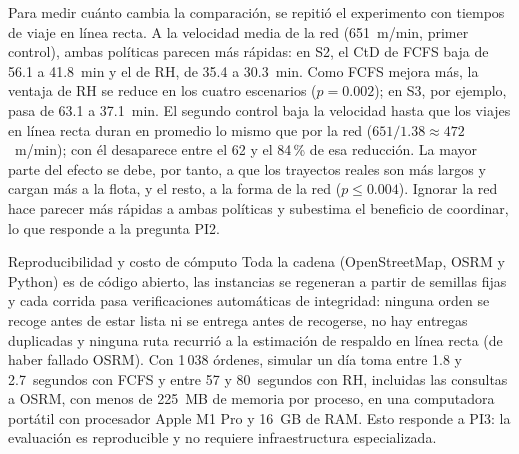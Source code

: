\documentclass[10pt]{article}
\makeatletter
\renewcommand{\subsection}{\@startsection{subsection}{2}{0pt}{8pt}{0.1pt}
  {\semibold\itshape\fontsize{11}{13.4}\selectfont\addfontfeatures{LetterSpace=6.8}\raggedright}}
\makeatother
\begin{document}
Para medir cuánto cambia la comparación, se repitió el experimento con tiempos de viaje en línea
recta. A la velocidad media de la red (651~m/min, primer control), ambas políticas parecen más
rápidas: en S2, el CtD de FCFS baja de 56.1 a 41.8~min y el de RH, de 35.4 a 30.3~min. Como FCFS
mejora más, la ventaja de RH se reduce en los cuatro escenarios ($p = 0.002$); en S3, por ejemplo,
pasa de 63.1 a 37.1~min. El segundo control baja la velocidad hasta que los viajes en línea recta
duran en promedio lo mismo que por la red ($651/1.38 \approx 472$~m/min); con él desaparece entre el
62 y el 84\,\% de esa reducción. La mayor parte del efecto se debe, por tanto, a que los trayectos
reales son más largos y cargan más a la flota, y el resto, a la forma de la red ($p \leq 0.004$).
Ignorar la red hace parecer más rápidas a ambas políticas y subestima el beneficio de coordinar, lo
que responde a la pregunta PI2.

\subsection{Reproducibilidad y costo de cómputo}
Toda la cadena (OpenStreetMap, OSRM y Python) es de código abierto, las instancias se regeneran a
partir de semillas fijas y cada corrida pasa verificaciones automáticas de integridad: ninguna orden
se recoge antes de estar lista ni se entrega antes de recogerse, no hay entregas duplicadas y ninguna
ruta recurrió a la estimación de respaldo en línea recta (de haber fallado OSRM). Con 1\,038 órdenes, simular un día toma
entre 1.8 y 2.7~segundos con FCFS y entre 57 y 80~segundos con RH, incluidas las consultas a OSRM, con menos de
225~MB de memoria por proceso, en una computadora portátil con procesador Apple M1 Pro y 16~GB de
RAM. Esto responde a PI3: la evaluación es reproducible y no requiere infraestructura especializada.
\end{document}
